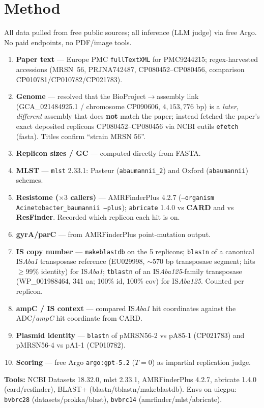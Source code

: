 \documentclass[11pt]{article}
\begin{document}
\section{Method}
All data pulled from free public sources; all inference (LLM judge) via free Argo. No paid endpoints, no PDF/image tools.
\begin{enumerate}[leftmargin=1.5em]
\item \textbf{Paper text} --- Europe PMC \texttt{fullTextXML} for PMC9244215; regex-harvested accessions (MRSN~56, PRJNA742487, CP080452--CP080456, comparison CP010781/CP010782/CP021783).
\item \textbf{Genome} --- resolved that the BioProject$\to$assembly link (GCA\_021484925.1 / chromosome CP090606, $4{,}153{,}776$ bp) is a \emph{later, different} assembly that does \textbf{not} match the paper; instead fetched the paper's exact deposited replicons CP080452--CP080456 via NCBI eutils \texttt{efetch} (fasta). Titles confirm ``strain MRSN 56''.
\item \textbf{Replicon sizes / GC} --- computed directly from FASTA.
\item \textbf{MLST} --- \texttt{mlst} 2.33.1: Pasteur (\texttt{abaumannii\_2}) and Oxford (\texttt{abaumannii}) schemes.
\item \textbf{Resistome ($\times 3$ callers)} --- AMRFinderPlus 4.2.7 (\texttt{--organism Acinetobacter\_baumannii --plus}); \texttt{abricate} 1.4.0 vs \textbf{CARD} and vs \textbf{ResFinder}. Recorded which replicon each hit is on.
\item \textbf{gyrA/parC} --- from AMRFinderPlus point-mutation output.
\item \textbf{IS copy number} --- \texttt{makeblastdb} on the 5 replicons; \texttt{blastn} of a canonical IS\emph{Aba1} transposase reference (EU029998, $\sim$570 bp transposase segment; hits $\geq$99\% identity) for IS\emph{Aba1}; \texttt{tblastn} of an IS\emph{Aba125}-family transposase (WP\_001988464, 341 aa; 100\% id, 100\% cov) for IS\emph{Aba125}. Counted per replicon.
\item \textbf{ampC / IS context} --- compared IS\emph{Aba1} hit coordinates against the ADC/\emph{ampC} hit coordinate from CARD.
\item \textbf{Plasmid identity} --- \texttt{blastn} of pMRSN56-2 vs pA85-1 (CP021783) and pMRSN56-4 vs pA1-1 (CP010782).
\item \textbf{Scoring} --- free Argo \texttt{argo:gpt-5.2} ($T{=}0$) as impartial replication judge.
\end{enumerate}
\noindent\textbf{Tools:} NCBI Datasets 18.32.0, mlst 2.33.1, AMRFinderPlus 4.2.7, abricate 1.4.0 (card/resfinder), BLAST+ (blastn/tblastn/makeblastdb). Envs on uicgpu: \texttt{bvbrc28} (datasets/prokka/blast), \texttt{bvbrc14} (amrfinder/mlst/abricate).
\end{document}
